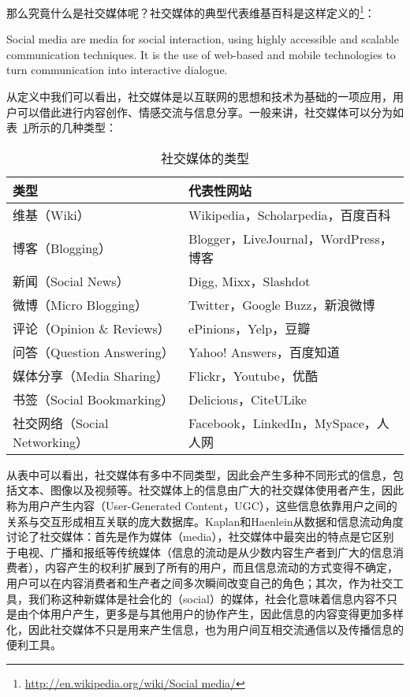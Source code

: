 那么究竟什么是社交媒体呢？社交媒体的典型代表维基百科是这样定义的\footnote{\url{http://en.wikipedia.org/wiki/Social media/}}：

\begin{definition}
Social media are media for social interaction, using highly accessible and scalable communication techniques. It is the use of web-based and mobile technologies to turn communication into interactive dialogue.
\end{definition}
从定义中我们可以看出，社交媒体是以互联网的思想和技术为基础的一项应用，用户可以借此进行内容创作、情感交流与信息分享。一般来讲，社交媒体可以分为如表~\ref{tab1-2}所示的几种类型：

\begin{table}[htp]
\centering
\caption{社交媒体的类型}
\label{tab1-2}
 \begin{tabular}{|l|l|}
 \hline
 类型& 代表性网站\\
 \hline
 维基（Wiki） & Wikipedia，Scholarpedia，百度百科\\
 \hline
 博客（Blogging） & Blogger，LiveJournal，WordPress，博客\\
 \hline
 新闻（Social News） & Digg, Mixx，Slashdot\\
 \hline
 微博（Micro Blogging） & Twitter，Google Buzz，新浪微博\\
 \hline
 评论（Opinion \& Reviews） & ePinions，Yelp，豆瓣\\
 \hline
 问答（Question Answering） & Yahoo! Answers，百度知道\\
 \hline
 媒体分享（Media Sharing） & Flickr，Youtube，优酷\\
 \hline
 书签（Social Bookmarking） & Delicious，CiteULike\\
 \hline
 社交网络（Social Networking） & Facebook，LinkedIn，MySpace，人人网\\
 \hline
\end{tabular}
\end{table}

从表中可以看出，社交媒体有多中不同类型，因此会产生多种不同形式的信息，包括文本、图像以及视频等。社交媒体上的信息由广大的社交媒体使用者产生，因此称为用户产生内容（User-Generated Content，UGC），这些信息依靠用户之间的关系与交互形成相互关联的庞大数据库。Kaplan和Haenlein从数据和信息流动角度讨论了社交媒体：首先是作为媒体（media），社交媒体中最突出的特点是它区别于电视、广播和报纸等传统媒体（信息的流动是从少数内容生产者到广大的信息消费者），内容产生的权利扩展到了所有的用户，而且信息流动的方式变得不确定，用户可以在内容消费者和生产者之间多次瞬间改变自己的角色；其次，作为社交工具，我们称这种新媒体是社会化的（social）的媒体，社会化意味着信息内容不只是由个体用户产生，更多是与其他用户的协作产生，因此信息的内容变得更加多样化，因此社交媒体不只是用来产生信息，也为用户间互相交流通信以及传播信息的便利工具。

